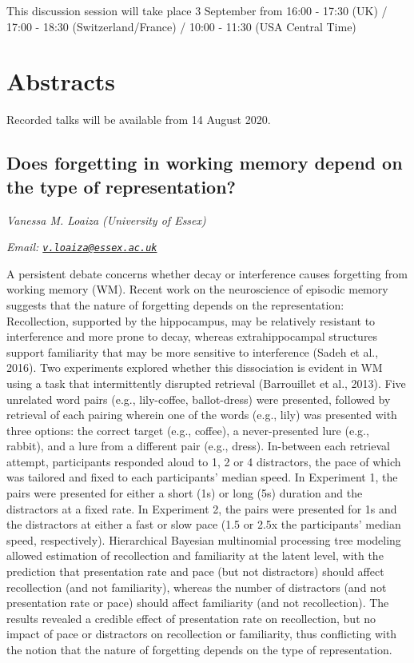 \documentclass[
  12pt,
]{book}
\begin{document}
This discussion session will take place 3 September from 16:00 - 17:30 (UK) / 17:00 - 18:30 (Switzerland/France) / 10:00 - 11:30 (USA Central Time)

\hypertarget{abstracts-5}{%
\section{Abstracts}\label{abstracts-5}}

Recorded talks will be available from 14 August 2020.

\hypertarget{does-forgetting-in-working-memory-depend-on-the-type-of-representation}{%
\subsection{Does forgetting in working memory depend on the type of representation?}\label{does-forgetting-in-working-memory-depend-on-the-type-of-representation}}

\emph{Vanessa M. Loaiza (University of Essex)}

\emph{Email: \href{mailto:v.loaiza@essex.ac.uk}{\nolinkurl{v.loaiza@essex.ac.uk}}}

A persistent debate concerns whether decay or interference causes forgetting from working memory (WM). Recent work on the neuroscience of episodic memory suggests that the nature of forgetting depends on the representation: Recollection, supported by the hippocampus, may be relatively resistant to interference and more prone to decay, whereas extrahippocampal structures support familiarity that may be more sensitive to interference (Sadeh et al., 2016). Two experiments explored whether this dissociation is evident in WM using a task that intermittently disrupted retrieval (Barrouillet et al., 2013). Five unrelated word pairs (e.g., lily-coffee, ballot-dress) were presented, followed by retrieval of each pairing wherein one of the words (e.g., lily) was presented with three options: the correct target (e.g., coffee), a never-presented lure (e.g., rabbit), and a lure from a different pair (e.g., dress). In-between each retrieval attempt, participants responded aloud to 1, 2 or 4 distractors, the pace of which was tailored and fixed to each participants' median speed. In Experiment 1, the pairs were presented for either a short (1s) or long (5s) duration and the distractors at a fixed rate. In Experiment 2, the pairs were presented for 1s and the distractors at either a fast or slow pace (1.5 or 2.5x the participants' median speed, respectively). Hierarchical Bayesian multinomial processing tree modeling allowed estimation of recollection and familiarity at the latent level, with the prediction that presentation rate and pace (but not distractors) should affect recollection (and not familiarity), whereas the number of distractors (and not presentation rate or pace) should affect familiarity (and not recollection). The results revealed a credible effect of presentation rate on recollection, but no impact of pace or distractors on recollection or familiarity, thus conflicting with the notion that the nature of forgetting depends on the type of representation.
\end{document}
